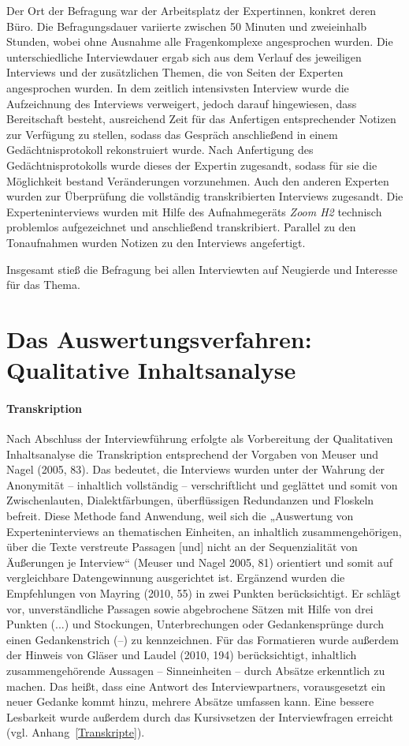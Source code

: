 Der Ort der Befragung war der Arbeitsplatz der Expertinnen, konkret deren Büro. Die Befragungsdauer variierte zwischen 50 Minuten und zweieinhalb Stunden, wobei ohne Ausnahme alle Fragenkomplexe angesprochen wurden. Die unterschiedliche Interviewdauer ergab sich aus dem Verlauf des jeweiligen Interviews und der zusätzlichen Themen, die von Seiten der Experten angesprochen wurden. In dem zeitlich intensivsten Interview wurde die Aufzeichnung des Interviews verweigert, jedoch darauf hingewiesen, dass Bereitschaft besteht, ausreichend Zeit für das Anfertigen entsprechender Notizen zur Verfügung zu stellen, sodass das Gespräch anschließend in einem Gedächtnisprotokoll rekonstruiert wurde. Nach Anfertigung des Gedächtnisprotokolls wurde dieses der Expertin zugesandt, sodass für sie die Möglichkeit bestand Veränderungen vorzunehmen. Auch den anderen Experten wurden zur Überprüfung die vollständig transkribierten Interviews zugesandt. 
Die Experteninterviews wurden mit Hilfe des Aufnahmegeräts \emph{Zoom H2} technisch problemlos aufgezeichnet und anschließend transkribiert. Parallel zu den Tonaufnahmen wurden Notizen zu den Interviews angefertigt.  

Insgesamt stieß die Befragung bei allen Interviewten auf Neugierde und Interesse für das Thema.

\section{Das Auswertungsverfahren: Qualitative Inhaltsanalyse}

\paragraph{Transkription} Nach Abschluss der Interviewführung erfolgte als Vorbereitung der Qualitativen Inhaltsanalyse die Transkription entsprechend der Vorgaben von Meuser und Nagel (2005, 83). Das bedeutet, die Interviews wurden unter der Wahrung der Anonymität -- inhaltlich vollständig -- verschriftlicht und geglättet und somit von Zwischenlauten, Dialektfärbungen, überflüssigen Redundanzen und Floskeln befreit. Diese Methode fand Anwendung, weil sich die „Auswertung von Experteninterviews an thematischen Einheiten, an inhaltlich zusammengehörigen, über die Texte verstreute Passagen [und] nicht an der Sequenzialität von Äußerungen je Interview“ (Meuser und Nagel 2005, 81) orientiert und somit auf vergleichbare Datengewinnung ausgerichtet ist. 
Ergänzend wurden die Empfehlungen von Mayring (2010, 55) in zwei Punkten berücksichtigt. Er schlägt vor, unverständliche Passagen sowie abgebrochene Sätzen mit Hilfe von drei Punkten (...) und Stockungen, Unterbrechungen oder Gedankensprünge durch einen Gedankenstrich (--) zu kennzeichnen. 
Für das Formatieren wurde außerdem der Hinweis von Gläser und Laudel (2010, 194) berücksichtigt, inhaltlich zusammengehörende Aussagen -- Sinneinheiten -- durch Absätze erkenntlich zu machen. Das heißt, dass eine Antwort des Interviewpartners, vorausgesetzt ein neuer Gedanke kommt hinzu, mehrere Absätze umfassen kann. Eine bessere Lesbarkeit wurde außerdem durch das Kursivsetzen der Interviewfragen erreicht (vgl. Anhang~\ref{Transkripte}). 

